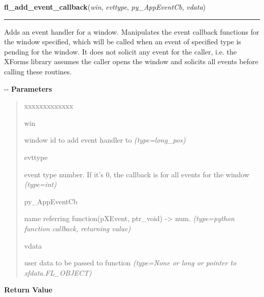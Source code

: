 \hspace{.8\funcindent}\begin{boxedminipage}{\funcwidth}

    \raggedright \textbf{fl\_add\_event\_callback}(\textit{win}, \textit{evttype}, \textit{py\_AppEventCb}, \textit{vdata})

    \vspace{-1.5ex}

    \rule{\textwidth}{0.5\fboxrule}
\setlength{\parskip}{2ex}

Adds an event handler for a window. Manipulates the event callback
functions for the window specified, which will be called when an
event of specified type is pending for the window. It does not
solicit any event for the caller, i.e. the XForms library assumes
the caller opens the window and solicits all events before calling
these routines.

-{}-
\setlength{\parskip}{1ex}
      \textbf{Parameters}
      \vspace{-1ex}

      \begin{quote}
        \begin{Ventry}{xxxxxxxxxxxxx}

          \item[win]


window id to add event handler to
            {\it (type=long\_pos)}

          \item[evttype]


event type number. If it's 0, the callback is for all events for the
window
            {\it (type=int)}

          \item[py\_AppEventCb]


name referring function(pXEvent, ptr\_void) -> num.
            {\it (type=python function callback, returning value)}

          \item[vdata]


user data to be passed to function
            {\it (type=None or long or pointer to xfdata.FL\_OBJECT)}

        \end{Ventry}

      \end{quote}

      \textbf{Return Value}
    \vspace{-1ex}

      \begin{quote}


\end{quote}
\end{boxedminipage}

